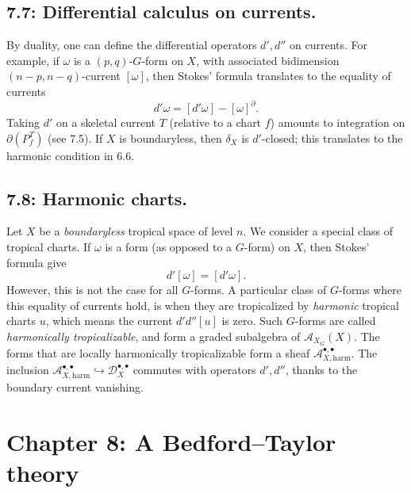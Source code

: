 \documentclass[12pt,reqno]{amsart}
\theoremstyle{definition}
\theoremstyle{remark}
\theoremstyle{citedrem}
\theoremstyle{cited}
\theoremstyle{citeddef}
\theoremstyle{step}
\begin{document}
\subsection*{7.7: Differential calculus on currents. }
By duality, one can define the differential operators $d', d''$ on currents. For example, if $\omega$ is a $(p,q)$-$G$-form on $X$, with associated bidimension $(n-p, n-q)$-current $[\omega]$, then Stokes' formula translates to the equality of currents \[d' \omega = [d'\omega] - [\omega]^\partial.\] Taking $d'$ on a skeletal current $T$ (relative to a chart $f$) amounts to integration on $\partial(P^T_f)$ (see 7.5). If $X$ is boundaryless, then $\delta_X$ is $d'$-closed; this translates to the harmonic condition in 6.6.

\subsection*{7.8: Harmonic charts. }Let $X$ be a \emph{boundaryless} tropical space of level $n$. We consider a special class of tropical charts. If $\omega$ is a form (as opposed to a $G$-form) on $X$, then Stokes' formula give \[d' [\omega] = [d'\omega].\] However, this is not the case for all $G$-forms. A particular class of $G$-forms where this equality of currents hold, is when they are tropicalized by \emph{harmonic} tropical charts $u$, which means the current $d' d'' [u]$ is zero. Such $G$-forms are called \emph{harmonically tropicalizable}, and form a graded subalgebra of $\mathcal{A}_{X_G}(X)$. The forms that are locally harmonically tropicalizable form a sheaf $\mathcal{A}^{\bullet,\bullet}_{X, \mathrm{harm}}$. The inclusion $\mathcal{A}^{\bullet,\bullet}_{X, \mathrm{harm}} \hookrightarrow \mathcal{D}_X^{\bullet,\bullet}$ commutes with operators $d', d''$, thanks to the boundary current vanishing. 

\section*{Chapter 8: A Bedford--Taylor theory}
\end{document}
